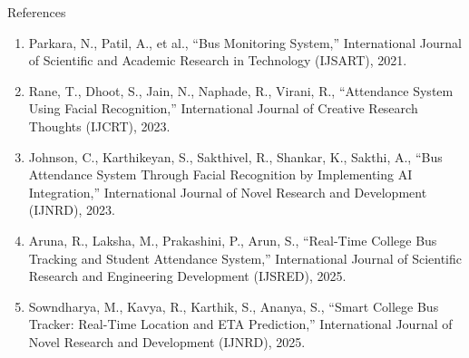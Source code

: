 \documentclass{beamer}
\begin{document}
\begin{frame}{References}
\scriptsize
\begin{enumerate}
\item Parkara, N., Patil, A., et al.,
      “Bus Monitoring System,”
      International Journal of Scientific and Academic Research in Technology (IJSART),
      2021.

\item Rane, T., Dhoot, S., Jain, N., Naphade, R., Virani, R.,
      “Attendance System Using Facial Recognition,”
      International Journal of Creative Research Thoughts (IJCRT),
      2023.

\item Johnson, C., Karthikeyan, S., Sakthivel, R., Shankar, K., Sakthi, A.,
      “Bus Attendance System Through Facial Recognition by Implementing AI Integration,”
      International Journal of Novel Research and Development (IJNRD),
      2023.

\item Aruna, R., Laksha, M., Prakashini, P., Arun, S.,
      “Real-Time College Bus Tracking and Student Attendance System,”
      International Journal of Scientific Research and Engineering Development (IJSRED),
      2025.

\item Sowndharya, M., Kavya, R., Karthik, S., Ananya, S.,
      “Smart College Bus Tracker: Real-Time Location and ETA Prediction,”
      International Journal of Novel Research and Development (IJNRD),
      2025.
\end{enumerate}
\end{frame}
\end{document}
